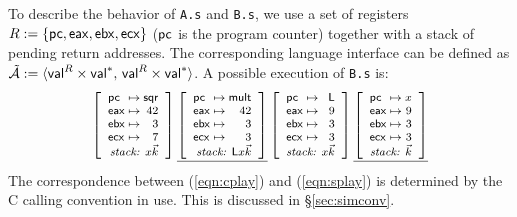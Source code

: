 \documentclass[sigplan,screen]{acmart}
\begin{document}
\begin{example}
To describe the behavior of \texttt{A.s} and \texttt{B.s},
we use a set of registers
$R := \{  \mathsf{pc} ,  \mathsf{eax} ,  \mathsf{ebx} ,  \mathsf{ecx}  \}$
($ \mathsf{pc} $ is the program counter)
together with a stack of pending return addresses.
The corresponding language interface can be defined as
$\tilde{\mathcal{A}} :=
 \langle  \mathsf{val} ^R \times  \mathsf{val} ^*, \,
          \mathsf{val} ^R \times  \mathsf{val} ^* \rangle$.
A possible execution of \texttt{B.s}
is: %
\begin{equation} \label{eqn:splay}
{
  \footnotesize
  \left[
    \begin{array}{l@{{} \mapsto {}}r}
      \kw{pc}  & \kw{sqr} \\
      \kw{eax} & 42 \\
      \kw{ebx} & 3 \\
      \kw{ecx} & 7 \\
      \multicolumn{2}{r}{\textit{stack: } x \vec{k}}
    \end{array}
  \right] %
  \underline{
    \left[
      \begin{array}{l@{{} \mapsto {}}r}
        \kw{pc}  & \kw{mult} \\
        \kw{eax} & 42 \\
        \kw{ebx} & 3 \\
        \kw{ecx} & 3 \\
        \multicolumn{2}{r}{\textit{stack: } \kw{L} x \vec{k}}
      \end{array}
    \right]} %
  \left[
    \begin{array}{l@{{} \mapsto {}}r}
      \kw{pc}  & \kw{L} \\
      \kw{eax} & 9 \\
      \kw{ebx} & 3 \\
      \kw{ecx} & 3 \\
      \multicolumn{2}{r}{\textit{stack: } x \vec{k}}
    \end{array}
  \right] %
  \underline{
    \left[
      \begin{array}{l@{{} \mapsto {}}r}
        \kw{pc}  & x \\
        \kw{eax} & 9 \\
        \kw{ebx} & 3 \\
        \kw{ecx} & 3 \\
        \multicolumn{2}{r}{\textit{stack: } \vec{k}}
      \end{array}
    \right]}
}
\end{equation}
The correspondence between (\ref{eqn:cplay}) and (\ref{eqn:splay})
is determined by the C calling convention in use.
This is discussed in \S\ref{sec:simconv}.
\end{example}
\end{document}
